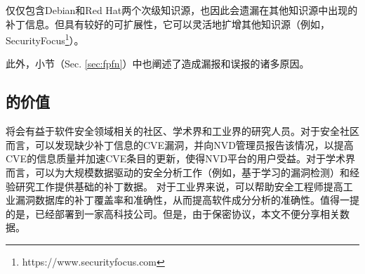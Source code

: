 \tool 仅仅包含Debian和Red Hat两个次级知识源，也因此会遗漏在其他知识源中出现的补丁信息。但\tool 具有较好的可扩展性，它可以灵活地扩增其他知识源（例如，SecurityFocus\footnote{https://www.securityfocus.com}）。

此外，小节（Sec. \ref{sec:fpfn}）中也阐述了造成\tool 漏报和误报的诸多原因。

\subsection{\tool 的价值}
\tool 将会有益于软件安全领域相关的社区、学术界和工业界的研究人员。对于安全社区而言，\tool 可以发现缺少补丁信息的CVE漏洞，并向NVD管理员报告该情况，以提高CVE的信息质量并加速CVE条目的更新，使得NVD平台的用户受益。对于学术界而言，\tool 可以为大规模数据驱动的安全分析工作（例如，基于学习的漏洞检测\cite{li2018vuldeepecker,zhou2019devign}）和经验研究工作提供基础的补丁数据。%
对于工业界来说，\tool 可以帮助安全工程师提高工业漏洞数据库的补丁覆盖率和准确性，从而提高软件成分分析的准确性。值得一提的是，\tool 已经部署到一家高科技公司。但是，由于保密协议，本文不便分享相关数据。